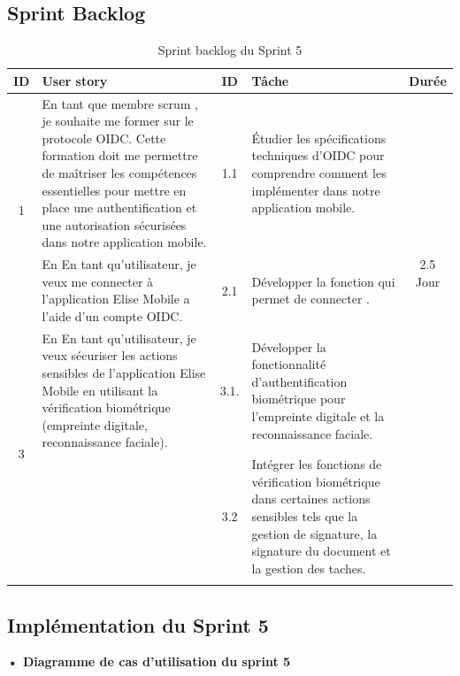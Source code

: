 \subsection{Sprint Backlog}


\begin{adjustwidth}{-1cm}{}
    
    \begin{longtable}{|c|p{6cm}|c|p{6cm}|c|}
      \hline
      \textbf{ID} & \textbf{User story} & \textbf{ID}  & \textbf{Tâche} & \textbf{Durée} \\
      \hline
      \multirow{2}{*}{1} & En tant que membre scrum , je souhaite me former sur le protocole OIDC. Cette formation doit me permettre de maîtriser les compétences essentielles pour mettre en place une authentification et une autorisation sécurisées dans notre application mobile.
      & 1.1 & Étudier les spécifications techniques d'OIDC pour comprendre comment les implémenter dans notre application mobile. & \multirow{3}{*}{2.5 Jour} \\
      \cline{1-5}
      \multirow{2}{*}{2} & En En tant qu'utilisateur, je veux me connecter à l'application Elise Mobile a l'aide d'un compte OIDC. & 2.1 & Développer la fonction qui permet de connecter . &  \multirow{3}{*}{2.5 Jour} \\
      \cline{1-5}
      \multirow{2}{*}{3} & En En tant qu’utilisateur, je veux sécuriser les actions sensibles de l’application Elise Mobile en utilisant la vérification biométrique (empreinte digitale, reconnaissance faciale). & 3.1.& Développer la fonctionnalité d'authentification biométrique pour l'empreinte digitale et la reconnaissance faciale. & \multirow{2}{*}{0.5 Jour} \\
      \cline{3-4}
      & & 3.2 & Intégrer les fonctions de vérification biométrique dans certaines actions sensibles tels que la gestion de signature, la signature du document et la gestion des taches. & \\
      \cline{1-5}
  \hline
  \caption{Sprint backlog du Sprint 5}
  \label{tab:sprint-backlog-5}
\end{longtable}
\end{adjustwidth}


\subsection{Implémentation du Sprint 5}
\textbf{•	Diagramme de cas d'utilisation du sprint 5}

